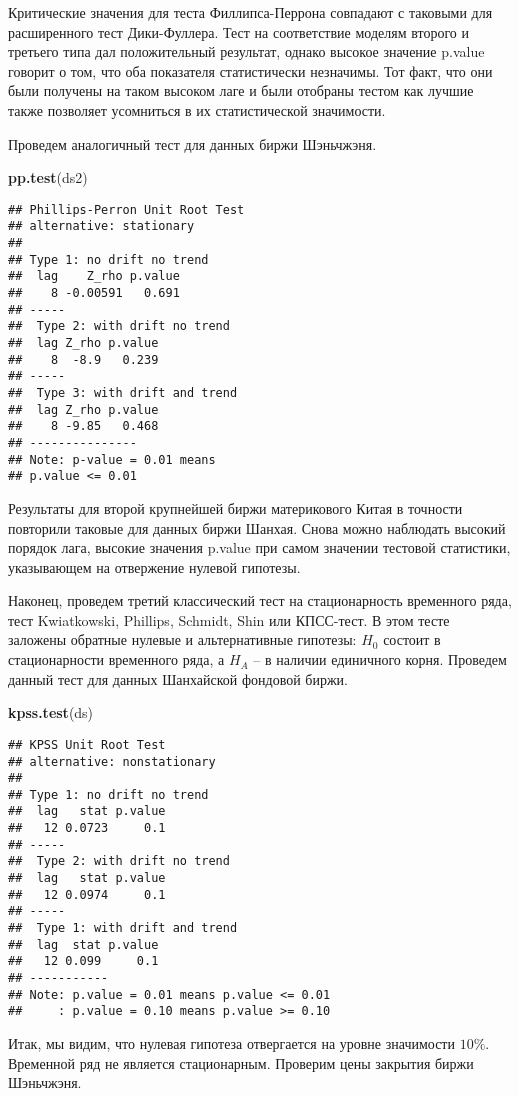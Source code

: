 \documentclass[a4paper,12pt]{article}
\newenvironment{Shaded}{\begin{snugshade}}{\end{snugshade}}
\newcommand{\KeywordTok}[1]{\textcolor[rgb]{0.13,0.29,0.53}{\textbf{#1}}}
\newcommand{\NormalTok}[1]{#1}
\begin{document}
Критические значения для теста Филлипса-Перрона совпадают с таковыми для расширенного тест Дики-Фуллера. Тест на соответствие моделям второго и третьего типа дал положительный результат, однако высокое значение p.value говорит о том, что оба показателя статистически незначимы. Тот факт, что они были получены на таком высоком лаге и были отобраны тестом как лучшие также позволяет усомниться в их статистической значимости.

Проведем аналогичный тест для данных биржи Шэньчжэня.

\begin{Shaded}
\begin{Highlighting}[]
\KeywordTok{pp.test}\NormalTok{(ds2)}
\end{Highlighting}
\end{Shaded}
\begin{multicols}{2}
\begin{Verbatim}[fontsize=\small]
## Phillips-Perron Unit Root Test
## alternative: stationary
##
## Type 1: no drift no trend
##  lag    Z_rho p.value
##    8 -0.00591   0.691
## -----
##  Type 2: with drift no trend
##  lag Z_rho p.value
##    8  -8.9   0.239
## -----
##  Type 3: with drift and trend
##  lag Z_rho p.value
##    8 -9.85   0.468
## ---------------
## Note: p-value = 0.01 means
## p.value <= 0.01
\end{Verbatim}
\end{multicols}

Результаты для второй крупнейшей биржи материкового Китая в точности повторили таковые для данных биржи Шанхая. Снова можно наблюдать высокий порядок лага, высокие значения p.value при самом значении тестовой статистики, указывающем на отвержение нулевой гипотезы.

Наконец, проведем третий классический тест на стационарность временного ряда, тест Kwiatkowski, Phillips, Schmidt, Shin или КПСС-тест. В этом тесте заложены обратные нулевые и альтернативные гипотезы: $H_0$ состоит в стационарности временного ряда, а $H_A$ -- в наличии единичного корня. Проведем данный тест для данных Шанхайской фондовой биржи.

\begin{Shaded}
\begin{Highlighting}[]
\KeywordTok{kpss.test}\NormalTok{(ds)}
\end{Highlighting}
\end{Shaded}

\begin{multicols}{2}\begin{Verbatim}[fontsize=\small]
## KPSS Unit Root Test
## alternative: nonstationary
##
## Type 1: no drift no trend
##  lag   stat p.value
##   12 0.0723     0.1
## -----
##  Type 2: with drift no trend
##  lag   stat p.value
##   12 0.0974     0.1
## -----
##  Type 1: with drift and trend
##  lag  stat p.value
##   12 0.099     0.1
## -----------
## Note: p.value = 0.01 means p.value <= 0.01
##     : p.value = 0.10 means p.value >= 0.10
\end{Verbatim}
\end{multicols}
Итак, мы видим, что нулевая гипотеза отвергается на уровне значимости $10\%$. Временной ряд не является стационарным. Проверим цены закрытия биржи Шэньчжэня.
\end{document}
